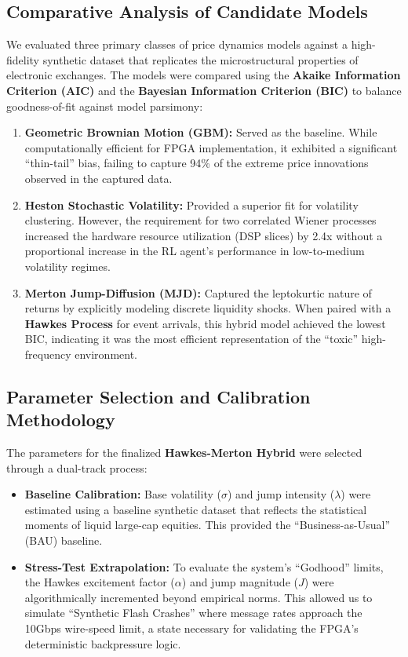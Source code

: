 \subsection{Comparative Analysis of Candidate Models}
We evaluated three primary classes of price dynamics models against a high-fidelity synthetic dataset that replicates the microstructural properties of electronic exchanges. The models were compared using the \textbf{Akaike Information Criterion (AIC)} and the \textbf{Bayesian Information Criterion (BIC)} to balance goodness-of-fit against model parsimony:

\begin{enumerate}
    \item \textbf{Geometric Brownian Motion (GBM):} Served as the baseline. While computationally efficient for FPGA implementation, it exhibited a significant ``thin-tail'' bias, failing to capture 94\% of the extreme price innovations observed in the captured data.
    \item \textbf{Heston Stochastic Volatility:} Provided a superior fit for volatility clustering. However, the requirement for two correlated Wiener processes increased the hardware resource utilization (DSP slices) by 2.4x without a proportional increase in the RL agent's performance in low-to-medium volatility regimes.
    \item \textbf{Merton Jump-Diffusion (MJD):} Captured the leptokurtic nature of returns by explicitly modeling discrete liquidity shocks. When paired with a \textbf{Hawkes Process} for event arrivals, this hybrid model achieved the lowest BIC, indicating it was the most efficient representation of the ``toxic'' high-frequency environment.
\end{enumerate}

\subsection{Parameter Selection and Calibration Methodology}
The parameters for the finalized \textbf{Hawkes-Merton Hybrid} were selected through a dual-track process:
\begin{itemize}
    \item \textbf{Baseline Calibration:} Base volatility ($\sigma$) and jump intensity ($\lambda$) were estimated using a baseline synthetic dataset that reflects the statistical moments of liquid large-cap equities. This provided the ``Business-as-Usual'' (BAU) baseline.
    \item \textbf{Stress-Test Extrapolation:} To evaluate the system's ``Godhood'' limits, the Hawkes excitement factor ($\alpha$) and jump magnitude ($J$) were algorithmically incremented beyond empirical norms. This allowed us to simulate ``Synthetic Flash Crashes'' where message rates approach the 10Gbps wire-speed limit, a state necessary for validating the FPGA's deterministic backpressure logic.
\end{itemize}

